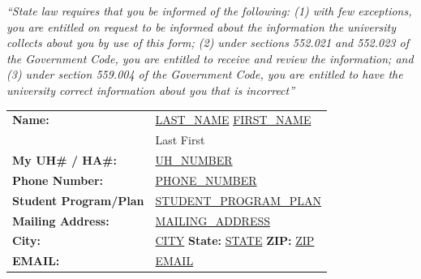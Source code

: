 \documentclass[11pt,letterpaper]{article}
\begin{document}
\thispagestyle{fancy}

\begin{small}
\textit{``State law requires that you be informed of the following: (1) with few exceptions, you are entitled on request to be informed about the information the university collects about you by use of this form; (2) under sections 552.021 and 552.023 of the Government Code, you are entitled to receive and review the information; and (3) under section 559.004 of the Government Code, you are entitled to have the university correct information about you that is incorrect''}
\end{small}

\vspace{0.3in}

\noindent
\begin{tabular}{@{}ll@{}}
\textbf{Name:} & \underline{{{LAST_NAME}}\hspace{0.3in}} \underline{{{FIRST_NAME}}\hspace{2in}} \\
& \small Last \hspace{1.2in} First \\[0.15in]
\textbf{My UH\# / HA\#:} & \underline{{{UH_NUMBER}}\hspace{1.5in}} \\[0.15in]
\textbf{Phone Number:} & \underline{{{PHONE_NUMBER}}\hspace{1.5in}} \\[0.15in]
\textbf{Student Program/Plan} & \underline{{{STUDENT_PROGRAM_PLAN}}\hspace{3.5in}} \\[0.15in]
\textbf{Mailing Address:} & \underline{{{MAILING_ADDRESS}}\hspace{3.5in}} \\[0.15in]
\textbf{City:} & \underline{{{CITY}}\hspace{1in}} \textbf{State:} \underline{{{STATE}}\hspace{0.3in}} \textbf{ZIP:} \underline{{{ZIP}}\hspace{0.5in}} \\[0.15in]
\textbf{EMAIL:} & \underline{{{EMAIL}}\hspace{3in}} \\
\end{tabular}

\vspace{0.15in}
\end{document}
